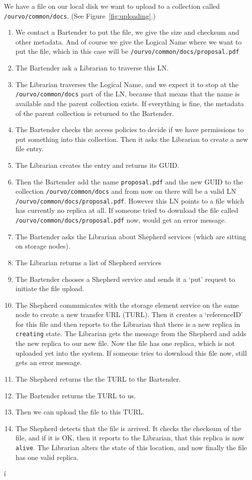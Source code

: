 \documentclass{book}
\begin{document}
We have a file on our local disk we want to upload to a collection called \verb#/ourvo/common/docs#. (See Figure~\ref{fig:uploading}.)
\begin{enumerate}
    \item We contact a Bartender to put the file, we give the size and checksum and other metadata. And of course we give the Logical Name where we want to put the file, which in this case will be \verb#/ourvo/common/docs/proposal.pdf#
    \item The Bartender ask a Librarian to traverse this LN.
    \item The Librarian traverses the Logical Name, and we expect it to stop at the \verb#/ourvo/common/docs# part of the LN, because that means that the name is available and the parent collection exists. If everything is fine, the metadata of the parent collection is returned to the Bartender. 
    \item The Bartender checks the access policies to decide if we have permissions to put something into this collection. Then it asks the Librarian to create a new file entry. 
    \item The Librarian creates the entry and returns its GUID.
    \item Then the Bartender add the name \verb#proposal.pdf# and the new GUID to the collection \verb#/ourvo/common/docs# and from now on there will be a valid LN \verb#/ourvo/common/docs/proposal.pdf#. However this LN points to a file which has currently no replica at all. If someone tried to download the file called \verb#/ourvo/common/docs/proposal.pdf# now, would get an error message.
    \item The Bartender asks the Librarian about Shepherd services (which are sitting on storage nodes).
    \item The Librarian returns a list of Shepherd services
    \item The Bartender chooses a Shepherd service and sends it a `put' request to initiate the file upload. 
    \item The Shepherd communicates with the storage element service on the same node to create a new transfer URL (TURL). Then it creates a `referenceID' for this file and then reports to the Librarian that there is a new replica in \verb#creating# state. The Librarian gets the message from the Shepherd and adds the new replica to our new file. Now the file has one replica, which is not uploaded yet into the system. If someone tries to download this file now, still gets an error message.
    \item The Shepherd returns the the TURL to the Bartender.
    \item The Bartender returns the TURL to us.
    \item Then we can upload the file to this TURL.
    \item The Shepherd detects that the file is arrived. It checks the checksum of the file, and if it is OK, then it reports to the Librarian, that this replica is now \verb#alive#. The Librarian alters the state of this location, and now finally the file has one valid replica. 
\end{enumerate}
í
\end{document}
